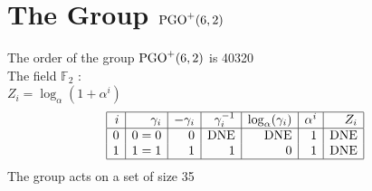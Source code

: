 
\section{The Group ${\rm PGO}^{+}(6,2)$}
\label{app:PGOp62}


\noindent The order of the group ${\rm PGO}^{+}(6,2)$ is 40320\\
\noindent The field ${\mathbb F}_{2}$ :\\
\small
$Z_i = \log_\alpha (1 + \alpha^i)$\\
$$\begin{array}{|*{7}{r|}}
\hline
i & \gamma_i & -\gamma_i& \gamma_i^{-1}& \log_\alpha(\gamma_i)& \alpha^i& Z_i\\
\hline
  0 & 0 = 0 &0 & \mbox{DNE} & \mbox{DNE} &1 & \mbox{DNE}\\
  1 &   1 = 1 &1 &1 &0 &1 & \mbox{DNE}\\
\hline
\end{array}
$$
\noindent The group acts on a set of size 35\\
